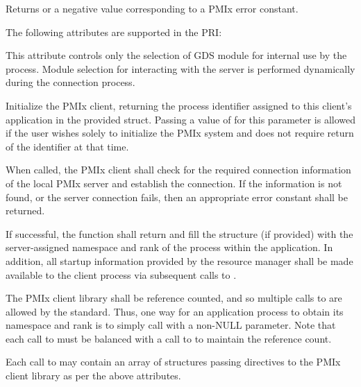 \begin{arglist}
\end{arglist}

Returns  or a negative value corresponding to a \ac{PMIx} error constant.

\priattr
The following attributes are supported in the \ac{PRI}:

 This attribute controls only the selection of GDS module for internal use by the process. Module selection for interacting with the server is performed dynamically during the connection process.
\pasteAttributeItemEnd{}

\descr

Initialize the \ac{PMIx} client, returning the process identifier assigned to this client's application in the provided  struct.
Passing a value of  for this parameter is allowed if the user wishes solely to initialize the \ac{PMIx} system and does not require return of the identifier at that time.

When called, the \ac{PMIx} client shall check for the required connection information of the local \ac{PMIx} server and establish the connection.
If the information is not found, or the server connection fails, then an appropriate error constant shall be returned.

If successful, the function shall return  and fill the  structure (if provided) with the server-assigned namespace and rank of the process within the application.
In addition, all startup information provided by the resource manager shall be made available to the client process via subsequent calls to .

The \ac{PMIx} client library shall be reference counted, and so multiple calls to  are allowed by the standard.
Thus, one way for an application process to obtain its namespace and rank is to simply call  with a non-NULL  parameter.
Note that each call to  must be balanced with a call to  to maintain the reference count.

Each call to  may contain an array of  structures passing directives to the \ac{PMIx} client library as per the above attributes.

